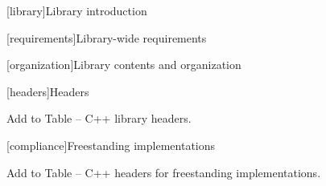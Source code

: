 
[library]{Library introduction}

\setcounter{section}{5}

[requirements]{Library-wide requirements}

[organization]{Library contents and organization}

\setcounter{subsubsection}{1}

[headers]{Headers}

\pnum
Add  to Table  -- C++ library headers.

[compliance]{Freestanding implementations}

Add  to Table  -- C++ headers for freestanding implementations.
